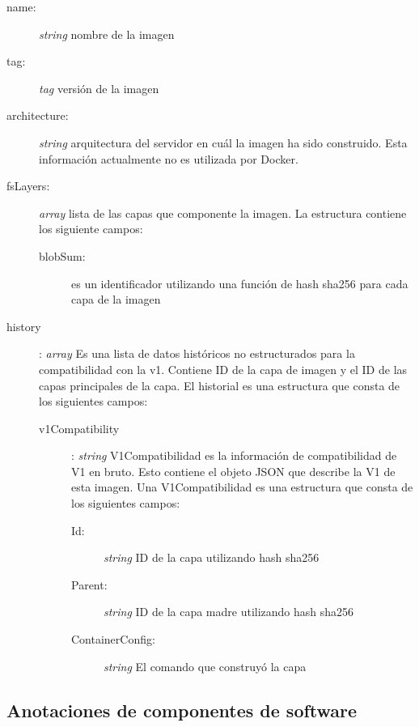 \begin{description}
	\item [name:] \textit{string} nombre de la imagen
	\item [tag:] \textit{tag} versión de la imagen
	\item [architecture:] \textit{string} arquitectura del servidor en cuál la imagen ha sido construido. Esta información actualmente no es utilizada por Docker.
	\item [fsLayers:] \textit{array} lista de las capas que componente la imagen.
		La estructura contiene los siguiente campos:
		\begin{description}
			\item [blobSum:] es un identificador utilizando una función de hash sha256 para cada capa de la imagen 
		\end{description}
	\item [history]: \textit{array} Es una lista de datos históricos no estructurados para la compatibilidad con la v1. Contiene ID de la capa de imagen y el ID de las capas principales de la capa. El historial es una estructura que consta de los siguientes campos:
	\begin{description}
		\item[v1Compatibility]:  \textit{string} V1Compatibilidad es la información de compatibilidad de V1 en bruto. Esto contiene el objeto JSON que describe la V1 de esta imagen. Una V1Compatibilidad es una estructura que consta de los siguientes campos:
		
		\begin{description}
			\item [Id:] \textit{string} ID de la capa utilizando hash sha256			\item [Parent:] \textit{string} ID de la capa madre utilizando hash sha256
				\item [ContainerConfig:] \textit{string} El comando que construyó la capa
		\end{description}
	\end{description}
\end{description}



\subsection{Anotaciones de componentes de software}\label{s4.2.2}

